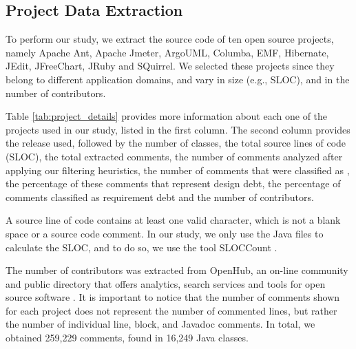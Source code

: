 \subsection{Project Data Extraction} %
\label{sub:data_extraction}

To perform our study, we extract the source code of ten open source projects, namely Apache Ant, Apache Jmeter, ArgoUML, Columba, EMF, Hibernate, JEdit, JFreeChart, JRuby and SQuirrel. We selected these projects since they belong to different application domains, and vary in size (e.g., SLOC), and in the number of contributors. 

Table \ref{tab:project_details} provides more information about each one of the projects used in our study, listed in the first column. The second column provides the release used, followed by the number of classes, the total source lines of code (SLOC), the total extracted comments, the number of comments analyzed after applying our filtering heuristics, the number of comments that were classified as \SATD, the percentage of these comments that represent design debt, the percentage of \SATD comments classified as requirement debt and the number of contributors. 

A source line of code contains at least one valid character, which is not a blank space or a source code comment. In our study, we only use the Java files to calculate the SLOC, and to do so, we use the tool SLOCCount \cite{wheeler2004:home}. 

The number of contributors was extracted from OpenHub, an on-line community and public directory that offers analytics, search services and tools for open source software \cite{Openhub:home}. It is important to notice that the number of comments shown for each project does not represent the number of commented lines, but rather the number of individual line, block, and Javadoc comments. In total, we obtained 259,229 comments, found in 16,249 Java classes.

